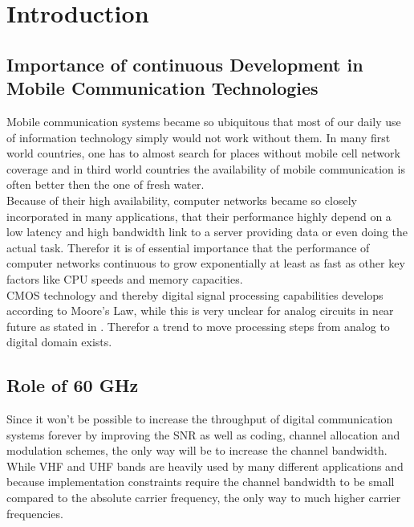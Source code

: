 \chapter{Introduction}
\label{ch:introduction}

\section{Importance of continuous Development in
  Mobile Communication Technologies}

Mobile communication systems became so ubiquitous that most of our daily
use of information technology simply would not work without them.
In many first world countries, one has to almost search for places without
mobile cell network coverage and in third world countries the availability of
mobile communication is often better then the one of fresh water. \\

Because of their high availability, computer networks became so closely
incorporated in many applications, that their performance highly depend
on a low latency and high bandwidth link to a server providing data or
even doing the actual task. Therefor it is of essential importance that
the performance of computer networks continuous \cite{web_content_delivery}
to grow exponentially at least as fast as other key factors like
\gls{CPU} speeds and memory capacities. \\

\acrshort{CMOS} technology and thereby digital signal processing capabilities
develops according to Moore's Law, while this is very unclear for analog
circuits in near future as stated in \cite{belgium}.
Therefor a trend to move processing steps from analog to digital
domain exists. \\

\section{Role of 60 GHz}
Since it won't be possible to increase the throughput of digital communication
systems forever by improving the \gls{SNR} as well as coding, channel allocation
and modulation schemes, the only way will be to increase the channel bandwidth.
While \gls{VHF} and \gls{UHF} bands are heavily used by many different
applications and because implementation constraints require the channel
bandwidth to be small compared to the absolute carrier frequency,
the only way to much higher carrier frequencies. \\

